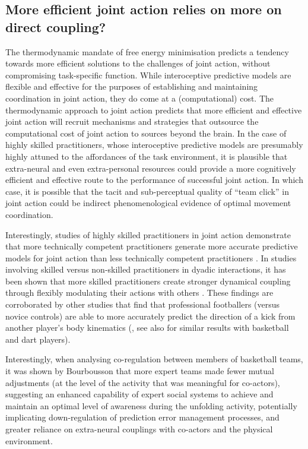 \begin{CJK}{UTF8}{gbsn}
\subsection{More efficient joint action relies on more on direct coupling?}

The thermodynamic mandate of free energy minimisation predicts a tendency towards more efficient solutions to the challenges of joint action, without compromising task-specific function.  While interoceptive predictive models are flexible and effective for the purposes of establishing and maintaining coordination in joint action, they do come at a (computational) cost.  The thermodynamic approach to joint action predicts that more efficient and effective joint action will recruit mechanisms and strategies that outsource the computational cost of joint action to sources beyond the brain. In the case of highly skilled practitioners, whose interoceptive predictive models are presumably highly attuned to the affordances of the task environment, it is plausible that extra-neural and even extra-personal resources could provide a more cognitively efficient and effective route to the performance of successful joint action.  In which case, it is possible that the tacit and sub-perceptual quality of ``team click'' in joint action could be indirect phenomenological evidence of optimal movement coordination.

Interestingly, studies of highly skilled practitioners in joint action demonstrate that more technically competent practitioners generate more accurate predictive models for joint action than less technically competent practitioners \citep{Tomeo2012,Aglioti2008,Mulligan2016}.   In studies involving skilled versus non-skilled practitioners in dyadic interactions, it has been shown that more skilled practitioners create stronger dynamical coupling through flexibly modulating their actions with others \citep{Schmidt2011, Caron2017}. These findings are corroborated by other studies that find that professional footballers (versus novice controls) are able to more accurately predict the direction of a kick from another player's body kinematics (\cite{Tomeo2012}, see also \cite{Aglioti2008,Mulligan2016} for similar results with basketball and dart players).

Interestingly, when analysing co-regulation between members of basketball teams, it was shown by Bourbousson \textcite{Bourbousson2015} that more expert teams made fewer mutual adjustments (at the level of the activity that was meaningful for co-actors), suggesting an enhanced capability of expert social systems to achieve and maintain an optimal level of awareness during the unfolding activity, potentially implicating down-regulation of prediction error management processes, and greater reliance on extra-neural couplings with co-actors and the physical environment.


\end{CJK}
